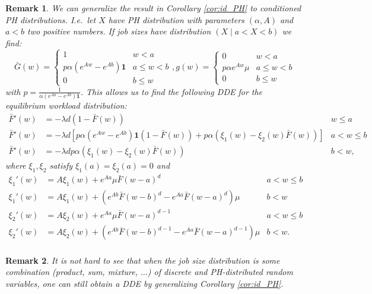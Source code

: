 \documentclass[12pt]{report}
\newtheorem{remark}{Remark}
\begin{document}
\begin{remark}
We can generalize the result in Corollary \ref{cor:id_PH} to conditioned PH distributions. I.e.~let $X$ have PH distribution with parameters $(\alpha, A)$ and $a<b$ two positive numbers. If job sizes have distribution $(X \mid a<X<b)$ we find:
$$
\bar G(w) = \begin{cases}
1 & w<a\\
p\alpha (e^{Aw}-e^{Ab}) \textbf{1} & a \leq w < b\\
0 & b \leq w
\end{cases},
g(w) = \begin{cases}
0 & w<a\\
p\alpha e^{Aw} \mu & a \leq w < b\\
0 & b \leq w
\end{cases}
$$
with $p=\frac{1}{\alpha (e^{Aa}-e^{Ab}) \textbf{1}}$. This allows us to find the following DDE for the equilibrium workload distribution:
\begin{align*}
\bar F'(w) &= -\lambda d (1-\bar F(w)) & w \leq a\\
\bar F'(w) &= -\lambda d \left[
p\alpha (e^{Aw}-e^{Ab})\textbf{1}(1-\bar F(w)) + p \alpha (\xi_1(w) - \xi_2(w) \bar F(w))
\right] & a < w \leq b\\
\bar F'(w) &= -\lambda d p \alpha (\xi_1(w) - \xi_2(w) \bar F(w))& b<w,
\end{align*}
where $\xi_1, \xi_2$ satisfy $\xi_1(a)=\xi_2(a)=0$ and
\begin{align*}
\xi_1'(w) &= A\xi_1(w) + e^{Aa} \mu \bar F(w-a)^d & a < w \leq b\\
\xi_1'(w) &= A\xi_1(w) + (e^{Ab} \bar F(w-b)^d - e^{Aa} \bar F(w-a)^d) \mu & b < w\\
\xi_2'(w) &= A\xi_2(w) + e^{Aa} \mu \bar F(w-a)^{d-1} & a < w \leq b\\
\xi_2'(w) &= A\xi_2(w) + (e^{Ab} \bar F(w-b)^{d-1} - e^{Aa} \bar F(w-a)^{d-1}) \mu & b < w.\\
\end{align*} 
\end{remark}
\begin{remark}
It is not hard to see that when the job size distribution is some combination (product, sum, mixture, $\dots$) of discrete and PH-distributed random variables, one can still obtain a DDE by
generalizing Corollary \ref{cor:id_PH}.
\end{remark}
\color{black}
\end{document}

